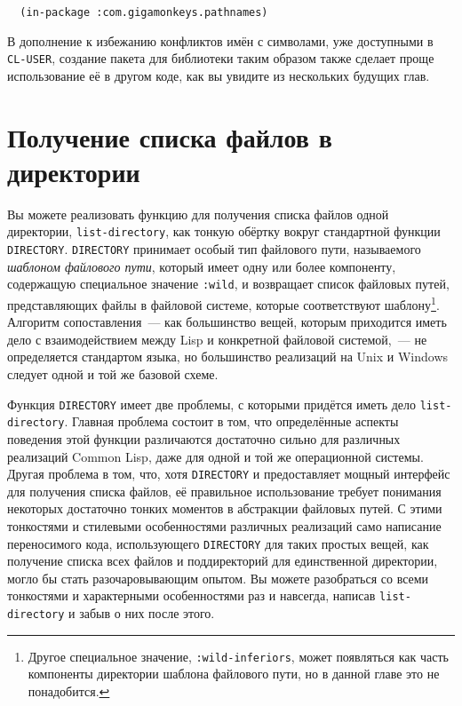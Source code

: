 \begin{lstlisting}
  (in-package :com.gigamonkeys.pathnames)
\end{lstlisting}

В дополнение к избежанию конфликтов имён с символами, уже доступными в \lstinline{CL-USER},
создание пакета для библиотеки таким образом также сделает проще использование её в другом
коде, как вы увидите из нескольких будущих глав.


\section{Получение списка файлов в директории}

Вы можете реализовать функцию для получения списка файлов одной директории,
\lstinline{list-directory}, как тонкую обёртку вокруг стандартной функции
\lstinline{DIRECTORY}. \lstinline{DIRECTORY} принимает особый тип файлового пути,
называемого \textit{шаблоном файлового пути}, который имеет одну или более компоненту,
содержащую специальное значение \lstinline{:wild}, и возвращает список файловых путей,
представляющих файлы в файловой системе, которые соответствуют шаблону\footnote{Другое
  специальное значение, \lstinline{:wild-inferiors}, может появляться как часть компоненты
  директории шаблона файлового пути, но в данной главе это не понадобится.}. Алгоритм
сопоставления~--- как большинство вещей, которым приходится иметь дело с взаимодействием
между Lisp и конкретной файловой системой,~--- не определяется стандартом языка, но
большинство реализаций на Unix и Windows следует одной и той же базовой схеме.

Функция \lstinline{DIRECTORY} имеет две проблемы, с которыми придётся иметь дело
\lstinline{list-directory}. Главная проблема состоит в том, что определённые аспекты поведения
этой функции различаются достаточно сильно для различных реализаций Common Lisp, даже для
одной и той же операционной системы. Другая проблема в том, что, хотя \lstinline{DIRECTORY} и
предоставляет мощный интерфейс для получения списка файлов, её правильное использование
требует понимания некоторых достаточно тонких моментов в абстракции файловых путей. С
этими тонкостями и стилевыми особенностями различных реализаций само написание
переносимого кода, использующего \lstinline{DIRECTORY} для таких простых вещей, как получение
списка всех файлов и поддиректорий для единственной директории, могло бы стать
разочаровывающим опытом. Вы можете разобраться со всеми тонкостями и характерными
особенностями раз и навсегда, написав \lstinline{list-directory} и забыв о них после этого.

